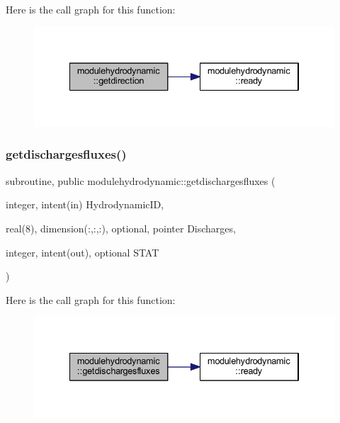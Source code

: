 Here is the call graph for this function\+:\nopagebreak
\begin{figure}[H]
\begin{center}
\leavevmode
\includegraphics[width=334pt]{namespacemodulehydrodynamic_aaf6054c97ad6e684bd893e075b4d0641_cgraph}
\end{center}
\end{figure}
\mbox{\label{namespacemodulehydrodynamic_ae3e2525663a2551838685e1e108e3145}} 
\subsubsection{\texorpdfstring{getdischargesfluxes()}{getdischargesfluxes()}}
{\footnotesize\ttfamily subroutine, public modulehydrodynamic\+::getdischargesfluxes (\begin{DoxyParamCaption}\item[{integer, intent(in)}]{Hydrodynamic\+ID,  }\item[{real(8), dimension(\+:,\+:,\+:), optional, pointer}]{Discharges,  }\item[{integer, intent(out), optional}]{S\+T\+AT }\end{DoxyParamCaption})}

Here is the call graph for this function\+:\nopagebreak
\begin{figure}[H]
\begin{center}
\leavevmode
\includegraphics[width=334pt]{namespacemodulehydrodynamic_ae3e2525663a2551838685e1e108e3145_cgraph}
\end{center}
\end{figure}
\mbox{\label{namespacemodulehydrodynamic_aba7eae61c437ef648710efabc4d39e36}} 
